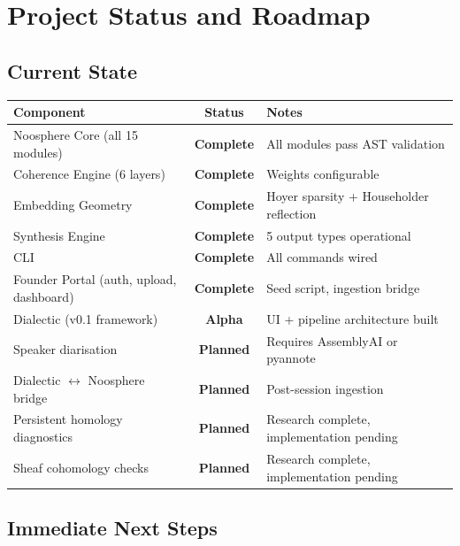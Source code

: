 \documentclass[11pt,letterpaper]{article}
\begin{document}
\section{Project Status and Roadmap}

\subsection{Current State}

\begin{center}
\begin{tabular}{lcl}
\toprule
\textbf{Component} & \textbf{Status} & \textbf{Notes} \\
\midrule
Noosphere Core (all 15 modules) & \color{teal}\textbf{Complete} & All modules pass AST validation \\
Coherence Engine (6 layers) & \color{teal}\textbf{Complete} & Weights configurable \\
Embedding Geometry & \color{teal}\textbf{Complete} & Hoyer sparsity + Householder reflection \\
Synthesis Engine & \color{teal}\textbf{Complete} & 5 output types operational \\
CLI & \color{teal}\textbf{Complete} & All commands wired \\
Founder Portal (auth, upload, dashboard) & \color{teal}\textbf{Complete} & Seed script, ingestion bridge \\
Dialectic (v0.1 framework) & \color{amber}\textbf{Alpha} & UI + pipeline architecture built \\
Speaker diarisation & \color{deepred}\textbf{Planned} & Requires AssemblyAI or pyannote \\
Dialectic $\leftrightarrow$ Noosphere bridge & \color{deepred}\textbf{Planned} & Post-session ingestion \\
Persistent homology diagnostics & \color{deepred}\textbf{Planned} & Research complete, implementation pending \\
Sheaf cohomology checks & \color{deepred}\textbf{Planned} & Research complete, implementation pending \\
\bottomrule
\end{tabular}
\end{center}

\subsection{Immediate Next Steps}
\end{document}
